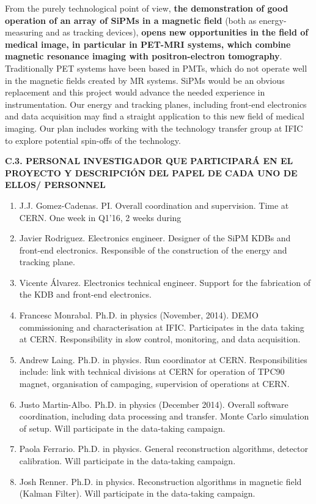 \documentclass[a4paper,11pt,oneside]{article}
\begin{document}
From the purely technological point of view, {\bf the demonstration of good operation of an array of SiPMs in a magnetic field} (both as energy-measuring and as tracking devices), {\bf opens new opportunities in the field of medical image, in particular in PET-MRI systems, which combine magnetic resonance imaging with positron-electron tomography}. Traditionally PET systems have been based in PMTs, which do not operate well in the magnetic fields created by MR systems. SiPMs would be an obvious replacement and this project would advance the needed experience in instrumentation. Our energy and tracking planes, including front-end electronics and data acquisition may find a straight application to this new field of medical imaging. Our plan includes working with the technology transfer group at IFIC to explore potential spin-offs of the technology. 


\vspace{12pt}

\noindent\textbf{C.3. PERSONAL INVESTIGADOR QUE PARTICIPARÁ EN EL PROYECTO Y DESCRIPCIÓN DEL PAPEL DE CADA UNO DE ELLOS/ PERSONNEL}
\begin{enumerate}
\item J.J. Gomez-Cadenas. PI. Overall coordination and supervision. Time at CERN. One week in Q1'16, 2 weeks during

\item Javier Rodriguez. Electronics engineer. Designer of the SiPM KDBs and front-end electronics. Responsible of the construction of the energy and tracking plane.
\item Vicente Álvarez. Electronics technical engineer. Support for the fabrication of the KDB and front-end electronics. 
 \item Francesc Monrabal. Ph.D. in physics (November, 2014). DEMO commissioning and characterisation at IFIC. Participates in the data taking at CERN. Responsibility in slow control, monitoring, and data acquisition.
\item Andrew Laing. Ph.D. in physics. Run coordinator at CERN. Responsibilities include: link with technical divisions at CERN for operation of TPC90 magnet, organisation of campaging, supervision of operations at CERN. 
\item Justo Martin-Albo. Ph.D. in physics (December 2014). Overall software coordination, including data processing and transfer. Monte Carlo simulation of setup. Will participate in the data-taking campaign. 
\item Paola Ferrario. Ph.D. in physics. General reconstruction algorithms, detector calibration. Will participate in the data-taking campaign. 
\item Josh Renner. Ph.D. in physics. Reconstruction algorithms in magnetic field (Kalman Filter). Will participate in the data-taking campaign.
\end{enumerate}
\end{document}
